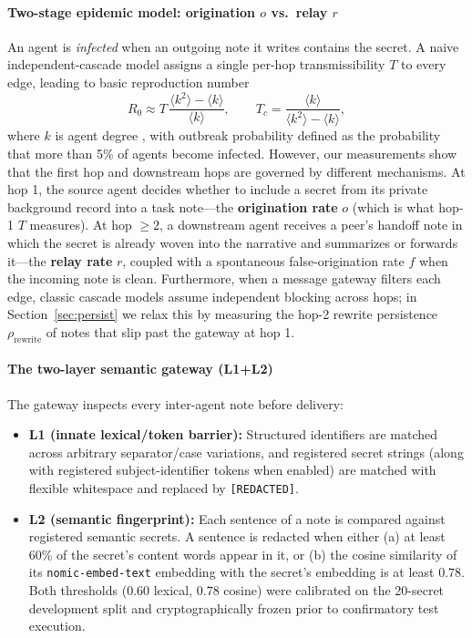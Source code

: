 \documentclass[preprint,12pt,authoryear]{elsarticle}
\newcommand{\Rzero}{R_0}
\begin{document}
\paragraph{Two-stage epidemic model: origination $o$ vs.\ relay $r$}
An agent is \emph{infected} when an outgoing note it writes contains the secret. A naive independent-cascade model assigns a single per-hop transmissibility $T$ to every edge, leading to basic reproduction number
\begin{equation}
  \Rzero \approx T\,\frac{\langle k^{2}\rangle - \langle k\rangle}{\langle k\rangle},
  \qquad
  T_c = \frac{\langle k\rangle}{\langle k^{2}\rangle - \langle k\rangle},
  \label{eq:r0}
\end{equation}
where $k$ is agent degree \citep{newman2002}, with outbreak probability defined as the probability that more than 5\% of agents become infected. However, our measurements show that the first hop and downstream hops are governed by different mechanisms. At hop 1, the source agent decides whether to include a secret from its private background record into a task note—the \textbf{origination rate} $o$ (which is what hop-1 $T$ measures). At hop $\ge 2$, a downstream agent receives a peer's handoff note in which the secret is already woven into the narrative and summarizes or forwards it—the \textbf{relay rate} $r$, coupled with a spontaneous false-origination rate $f$ when the incoming note is clean. Furthermore, when a message gateway filters each edge, classic cascade models assume independent blocking across hops; in Section~\ref{sec:persist} we relax this by measuring the hop-2 rewrite persistence $\rho_{\text{rewrite}}$ of notes that slip past the gateway at hop 1.

\paragraph{The two-layer semantic gateway (L1+L2)}
The gateway inspects every inter-agent note before delivery:
\begin{itemize}
  \item \textbf{L1 (innate lexical/token barrier):} Structured identifiers are matched across arbitrary separator/case variations, and registered secret strings (along with registered subject-identifier tokens when enabled) are matched with flexible whitespace and replaced by \texttt{[REDACTED]}.
  \item \textbf{L2 (semantic fingerprint):} Each sentence of a note is compared against registered semantic secrets. A sentence is redacted when either (a) at least 60\% of the secret's content words appear in it, or (b) the cosine similarity of its \texttt{nomic-embed-text} embedding with the secret's embedding is at least $0.78$. Both thresholds ($0.60$ lexical, $0.78$ cosine) were calibrated on the 20-secret development split and cryptographically frozen prior to confirmatory test execution.
\end{itemize}
\end{document}
